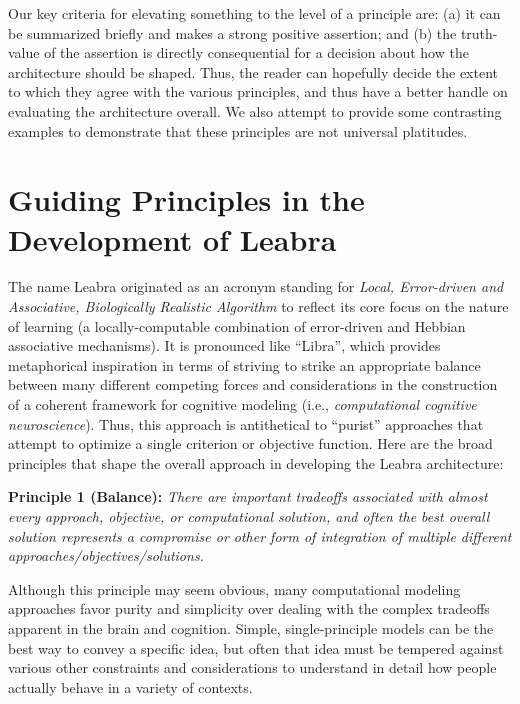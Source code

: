 \documentclass[11pt,twoside]{article}
\begin{document}
Our key criteria for elevating something to the level of a principle are: (a)
it can be summarized briefly and makes a strong positive assertion; and (b) the
truth-value of the assertion is directly consequential for a decision about
how the architecture should be shaped. 
Thus, the reader can hopefully decide
the extent to which they agree with the various principles, and thus have a
better handle on evaluating the architecture overall.  We also attempt to
provide some contrasting examples to demonstrate that these principles are not
universal platitudes.

\section{Guiding Principles in the Development of Leabra}

The name Leabra originated as an acronym standing for {\em Local, Error-driven
  and Associative, Biologically Realistic Algorithm} to reflect its core focus
on the nature of learning (a locally-computable combination of error-driven
and Hebbian associative mechanisms). It is pronounced like ``Libra'', which
provides metaphorical inspiration in terms of striving to strike an
appropriate balance between many different competing forces and considerations
in the construction of a coherent framework for cognitive modeling (i.e., {\em
  computational cognitive neuroscience}).  Thus, this approach is antithetical
to ``purist'' approaches that attempt to optimize a single criterion or
objective function.  Here are the broad principles that shape the overall
approach in developing the Leabra architecture:

{\bf Principle 1 (Balance):} {\em There are important tradeoffs associated
  with almost every approach, objective, or computational solution, and often
  the best overall solution represents a compromise or other form of
  integration of multiple different approaches/objectives/solutions.}

Although this principle may seem obvious, many computational modeling
approaches favor purity and simplicity over dealing with the complex tradeoffs
apparent in the brain and cognition.  Simple, single-principle models can be
the best way to convey a specific idea, but often that idea must be tempered
against various other constraints and considerations to understand in detail
how people actually behave in a variety of contexts.
\end{document}
